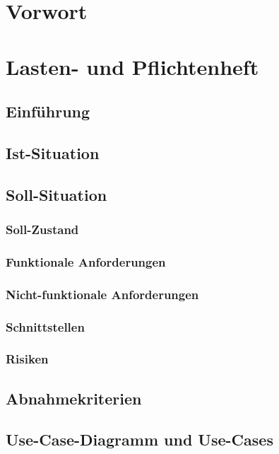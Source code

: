 \documentclass[12pt,a4paper]{article}
\begin{document}
\section*{Vorwort}


\section{Lasten- und Pflichtenheft}
\subsection{Einführung}

\subsection{Ist-Situation}

\subsection{Soll-Situation}
\subsubsection{Soll-Zustand}

\subsubsection{Funktionale Anforderungen}

\subsubsection{Nicht-funktionale Anforderungen}

\subsubsection{Schnittstellen}

\subsubsection{Risiken}

\subsection{Abnahmekriterien}

\subsection{Use-Case-Diagramm und Use-Cases}

\end{document}
